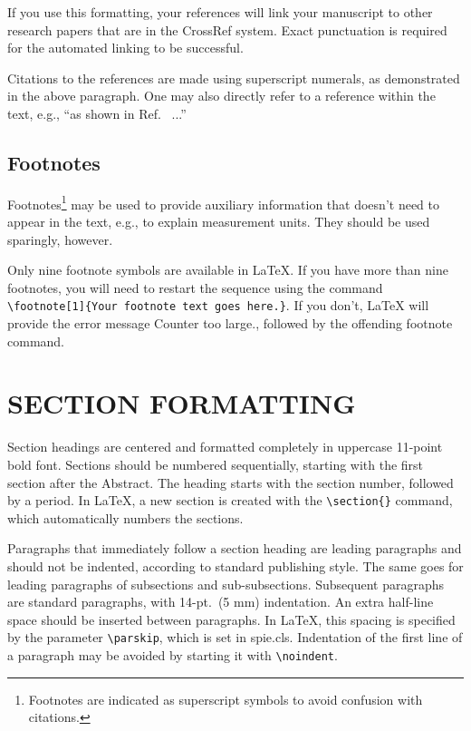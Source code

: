 \documentclass[]{spie}  %
\begin{document}
If you use this formatting, your references will link your manuscript to other research papers that are in the CrossRef system. Exact punctuation is required for the automated linking to be successful. 

Citations to the references are made using superscript numerals, as demonstrated in the above paragraph.  One may also directly refer to a reference within the text, e.g., ``as shown in Ref.~ ...''

\subsection{Footnotes}
Footnotes\footnote{Footnotes are indicated as superscript symbols to avoid confusion with citations.} may be used to provide auxiliary information that doesn't need to appear in the text, e.g., to explain measurement units.  They should be used sparingly, however.  

Only nine footnote symbols are available in LaTeX. If you have more than nine footnotes, you will need to restart the sequence using the command  \verb|\footnote[1]{Your footnote text goes here.}|. If you don't, LaTeX will provide the error message {\ttfamily Counter too large.}, followed by the offending footnote command.

\section{SECTION FORMATTING}
\label{sec:sections}

Section headings are centered and formatted completely in uppercase 11-point bold font.  Sections should be numbered sequentially, starting with the first section after the Abstract.  The heading starts with the section number, followed by a period.  In LaTeX, a new section is created with the \verb|\section{}| command, which automatically numbers the sections.

Paragraphs that immediately follow a section heading are leading paragraphs and should not be indented, according to standard publishing style\cite{Lamport94}.  The same goes for leading paragraphs of subsections and sub-subsections.  Subsequent paragraphs are standard paragraphs, with 14-pt.\ (5 mm) indentation.  An extra half-line space should be inserted between paragraphs.  In LaTeX, this spacing is specified by the parameter \verb|\parskip|, which is set in {\ttfamily spie.cls}.  Indentation of the first line of a paragraph may be avoided by starting it with \verb|\noindent|.
 
\end{document}
